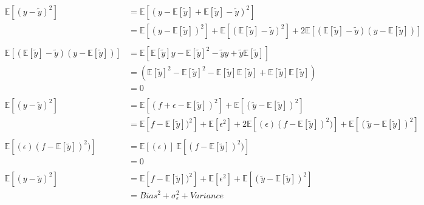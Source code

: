 \documentclass[12pt]{article}
\begin{document}
\begin{equation}
\begin{aligned}
	\mathbb{E}[ (y - \tilde y)^2 ] &= \mathbb{E}[(y - \mathbb{E}[\tilde y] + \mathbb{E}[\tilde y] - \tilde y )^2]
	\\
	& = \mathbb{E}[(y - \mathbb{E}[\tilde y])^2] + \mathbb{E}[(\mathbb{E}[\tilde y] - \tilde y)^2] + 2 \mathbb{E}[(\mathbb{E}[\tilde y] - \tilde y)(y - \mathbb{E}[\tilde y])]
	\\
	\\
\mathbb{E}[(\mathbb{E}[\tilde y] - \tilde y)(y - \mathbb{E}[\tilde y])] & = \mathbb{E}[\mathbb{E}[\tilde y]y - \mathbb{E}[\tilde y]^2 - \tilde y y + \tilde y \mathbb{E}[\tilde y]]
\\
& = ( \mathbb{E}[\tilde y]^2 - \mathbb{E}[\tilde y]^2 - \mathbb{E}[\tilde y] \mathbb{E}[\tilde y] + \mathbb{E}[\tilde y] \mathbb{E}[\tilde y] )
\\
	& =0
	\\
	\\
\mathbb{E}[ (y - \tilde y)^2 ]	& = 	\mathbb{E}[(f + \epsilon - \mathbb{E}[\tilde y])^2] + \mathbb{E}[(\tilde y - \mathbb{E}[\tilde y])^2]
	\\
	& = \mathbb{E}[f - \mathbb{E}[\tilde y])^2] + \mathbb{E}[\epsilon^2] + 2 \mathbb{E}[(\epsilon) (f - \mathbb{E}[\tilde y])^2)] + \mathbb{E}[(\tilde y -\mathbb{E}[\tilde y])^2]
	\\
	\\
\mathbb{E}[(\epsilon) (f - \mathbb{E}[\tilde y])^2)]	
	& = \mathbb{E}[(\epsilon)] \ \mathbb{E}[(f - \mathbb{E}[\tilde y])^2)]
	\\
	& = 0
	\\
	\\	
\mathbb{E}[ (y - \tilde y)^2 ]		& = \mathbb{E}[f - \mathbb{E}[\tilde y])^2] + \mathbb{E}[\epsilon^2] + \mathbb{E}[(\tilde y -\mathbb{E}[\tilde y])^2]
\\
& = Bias^2 + \sigma^2_\epsilon + Variance 
\end{aligned}
\end{equation}
\end{document}
